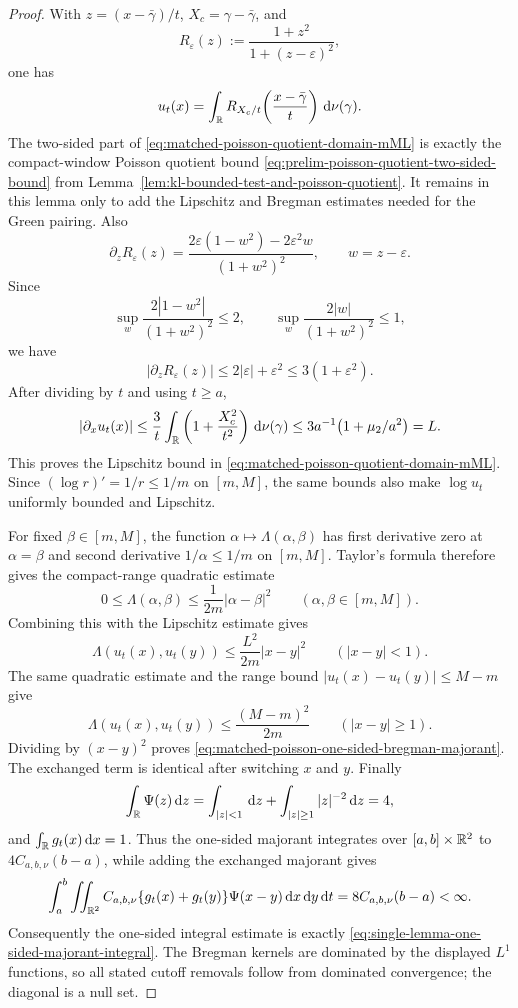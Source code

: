 \begin{proof}
With \(z=(x-\bar{\gamma})/t\), \(X_c=\gamma-\bar{\gamma}\), and
\[
R_\varepsilon(z):=\frac{1+z^2}{1+(z-\varepsilon)^2},
\]
one has
\[
u_t(x)=\int_{\mathbb{R}}R_{X_c/t}\!\left(\frac{x-\bar{\gamma}}{t}\right)\,\mathrm{d}\nu(\gamma).
\]
The two-sided part of \eqref{eq:matched-poisson-quotient-domain-mML} is
exactly the compact-window Poisson quotient bound
\eqref{eq:prelim-poisson-quotient-two-sided-bound} from
Lemma~\ref{lem:kl-bounded-test-and-poisson-quotient}.  It remains in this
lemma only to add the Lipschitz and Bregman estimates needed for the Green
pairing.
Also
\[
\partial_zR_\varepsilon(z)
=\frac{2\varepsilon(1-w^2)-2\varepsilon^2w}{(1+w^2)^2},
\qquad w=z-\varepsilon.
\]
Since
\[
\sup_w\frac{2|1-w^2|}{(1+w^2)^2}\le2,\qquad
\sup_w\frac{2|w|}{(1+w^2)^2}\le1,
\]
we have
\[
|\partial_zR_\varepsilon(z)|\le 2|\varepsilon|+\varepsilon^2
\le 3(1+\varepsilon^2).
\]
After dividing by \(t\) and using \(t\ge a\),
\[
|\partial_xu_t(x)|
\le \frac{3}{t}\int_{\mathbb{R}}\left(1+\frac{X_c^2}{t^2}\right)\,\mathrm{d}\nu(\gamma)
\le 3a^{-1}\bigl(1+\mu_2/a^2\bigr)=L.
\]
This proves the Lipschitz bound in
\eqref{eq:matched-poisson-quotient-domain-mML}.  Since
\((\log r)'=1/r\le1/m\) on \([m,M]\), the same bounds also make
\(\log u_t\) uniformly bounded and Lipschitz.

For fixed \(\beta\in[m,M]\), the function
\(\alpha\mapsto \Lambda(\alpha,\beta)\) has first derivative zero at
\(\alpha=\beta\) and second derivative \(1/\alpha\le1/m\) on \([m,M]\).
Taylor's formula therefore gives the compact-range quadratic estimate
\begin{equation}\label{eq:matched-poisson-compact-quadratic-bregman}
0\le \Lambda(\alpha,\beta)\le \frac{1}{2m}|\alpha-\beta|^2
\qquad(\alpha,\beta\in[m,M]).
\end{equation}
Combining this with the Lipschitz estimate gives
\[
\Lambda(u_t(x),u_t(y))
\le \frac{L^2}{2m}|x-y|^2\qquad(|x-y|<1).
\]
The same quadratic estimate and the range bound
\(|u_t(x)-u_t(y)|\le M-m\) give
\[
\Lambda(u_t(x),u_t(y))
\le \frac{(M-m)^2}{2m}\qquad(|x-y|\ge1).
\]
Dividing by \((x-y)^2\) proves
\eqref{eq:matched-poisson-one-sided-bregman-majorant}.  The exchanged term is
identical after switching \(x\) and \(y\).  Finally
\[
\int_{\mathbb{R}}\Psi(z)\,\mathrm{d} z
=\int_{|z|<1}\,\mathrm{d} z+\int_{|z|\ge1}|z|^{-2}\,\mathrm{d} z=4,
\]
and \(\int_{\mathbb{R}}g_t(x)\,\mathrm{d} x=1\).  Thus the one-sided majorant integrates over
\([a,b]\times\mathbb{R}^2\) to \(4C_{a,b,\nu}(b-a)\), while adding the exchanged
majorant gives
\[
\int_a^b\iint_{\mathbb{R}^2}
C_{a,b,\nu}\{g_t(x)+g_t(y)\}\Psi(x-y)\,\mathrm{d} x\,\mathrm{d} y\,\mathrm{d} t
=8C_{a,b,\nu}(b-a)<\infty .
\]
Consequently the one-sided integral estimate is exactly
\eqref{eq:single-lemma-one-sided-majorant-integral}.  The Bregman kernels are
dominated by the displayed \(L^1\) functions, so all stated cutoff removals
follow from dominated convergence; the diagonal is a null set.
\end{proof}

